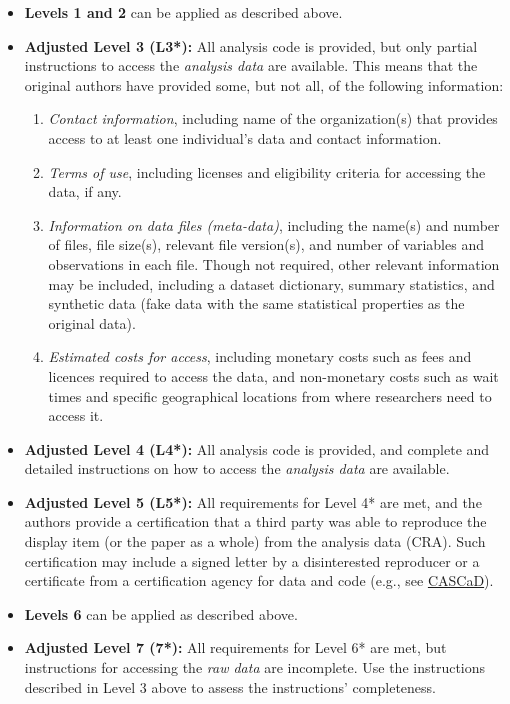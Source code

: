 \documentclass[
]{book}
\providecommand{\tightlist}{%
  \setlength{\itemsep}{0pt}\setlength{\parskip}{0pt}}
\begin{document}
\begin{itemize}
\item
  \textbf{Levels 1 and 2} can be applied as described above.
\item
  \textbf{Adjusted Level 3 (L3*):} All analysis code is provided, but only partial instructions to access the \emph{analysis data} are available. This means that the original authors have provided some, but not all, of the following information:

  \begin{enumerate}
  \def\labelenumi{\alph{enumi}.}
  \tightlist
  \item
    \emph{Contact information}, including name of the organization(s) that provides access to at least one individual's data and contact information.
  \item
    \emph{Terms of use}, including licenses and eligibility criteria for accessing the data, if any.
  \item
    \emph{Information on data files (meta-data)}, including the name(s) and number of files, file size(s), relevant file version(s), and number of variables and observations in each file. Though not required, other relevant information may be included, including a dataset dictionary, summary statistics, and synthetic data (fake data with the same statistical properties as the original data).
  \item
    \emph{Estimated costs for access}, including monetary costs such as fees and licences required to access the data, and non-monetary costs such as wait times and specific geographical locations from where researchers need to access it.
  \end{enumerate}
\item
  \textbf{Adjusted Level 4 (L4*):} All analysis code is provided, and complete and detailed instructions on how to access the \emph{analysis data} are available.
\item
  \textbf{Adjusted Level 5 (L5*):} All requirements for Level 4* are met, and the authors provide a certification that a third party was able to reproduce the display item (or the paper as a whole) from the analysis data (CRA). Such certification may include a signed letter by a disinterested reproducer or a certificate from a certification agency for data and code (e.g., see \href{https://www.cascad.tech/}{CASCaD}).
\item
  \textbf{Levels 6} can be applied as described above.
\item
  \textbf{Adjusted Level 7 (7*):} All requirements for Level 6* are met, but instructions for accessing the \emph{raw data} are incomplete. Use the instructions described in Level 3 above to assess the instructions' completeness.

\end{itemize}
\end{document}
